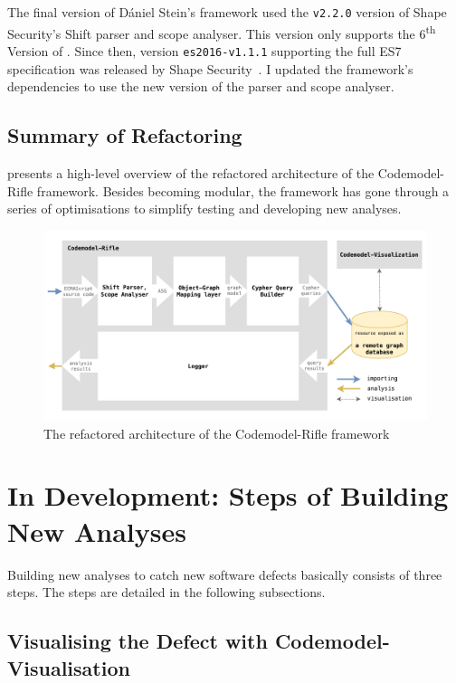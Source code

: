 The final version of Dániel Stein's framework used the \lstinline{v2.2.0} version of Shape Security's Shift parser and scope analyser. This version only supports the 6\textsuperscript{th} Version of \es. Since then, version \lstinline{es2016-v1.1.1} supporting the full ES7 specification was released by Shape Security~\cite{shift-ast, shift-java-github}. I updated the framework's dependencies to use the new version of the parser and scope analyser.

\subsection{Summary of Refactoring}

 presents a high-level overview of the refactored architecture of the Codemodel-Rifle framework. Besides becoming modular, the framework has gone through a series of optimisations to simplify testing and developing new analyses.

\begin{figure}[!htb]
	\centering
	\includegraphics[width=\textwidth, trim=3mm 3mm 3mm 3mm,clip]{figures/codemodel-rifle-refactored-architecture.pdf}
	\caption{The refactored architecture of the Codemodel-Rifle framework}
	\label{fig:codemodel-rifle-refactored-architecture}
\end{figure}


\section{In Development: Steps of Building New Analyses}

Building new analyses to catch new software defects basically consists of three steps. The steps are detailed in the following subsections.


\subsection{Visualising the Defect with Codemodel-Visualisation}

